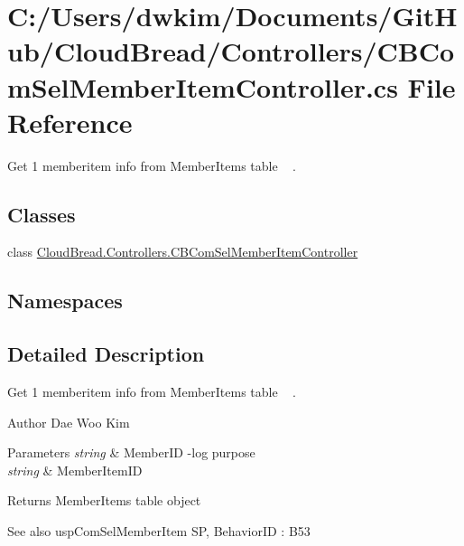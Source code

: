 \hypertarget{a00130}{}\section{C\+:/\+Users/dwkim/\+Documents/\+Git\+Hub/\+Cloud\+Bread/\+Controllers/\+C\+B\+Com\+Sel\+Member\+Item\+Controller.cs File Reference}
\label{a00130}


Get 1 memberitem info from Member\+Items table ~\newline
.  


\subsection*{Classes}
\begin{DoxyCompactItemize}
\item 
class \hyperlink{a00019}{Cloud\+Bread.\+Controllers.\+C\+B\+Com\+Sel\+Member\+Item\+Controller}
\end{DoxyCompactItemize}
\subsection*{Namespaces}
\begin{DoxyCompactItemize}
\end{DoxyCompactItemize}


\subsection{Detailed Description}
Get 1 memberitem info from Member\+Items table ~\newline
. 

\begin{DoxyAuthor}{Author}
Dae Woo Kim 
\end{DoxyAuthor}

\begin{DoxyParams}{Parameters}
{\em string} & Member\+ID -\/log purpose \\
\hline
{\em string} & Member\+Item\+ID \\
\hline
\end{DoxyParams}
\begin{DoxyReturn}{Returns}
Member\+Items table object 
\end{DoxyReturn}
\begin{DoxySeeAlso}{See also}
usp\+Com\+Sel\+Member\+Item SP, Behavior\+ID \+: B53 
\end{DoxySeeAlso}
